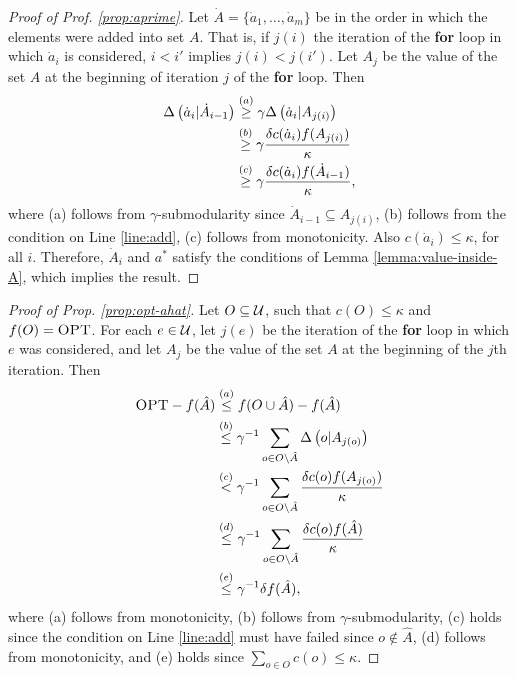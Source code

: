 \begin{proof}[Proof of Prof. \ref{prop:aprime}]
  Let $\dot A = \{\dot a_1, \ldots, \dot a_m \}$ be in the order in which the elements were added into set $A$.
  That is, if $j(i)$ the iteration of the \textbf{for} loop in which $\dot a_i$ is considered, $i < i'$ implies
  $j(i) < j(i')$. Let $A_j$ be the value of the set $A$ at the beginning of iteration $j$ of the \textbf{for}
  loop.
  Then
  \begin{align*}
    \Delta \left(  \dot a_i  |  \dot A_{i-1}  \right) &\overset{(a)}{\ge} \gamma \Delta \left(  \dot a_i  |  A_{j(i)}  \right) \\
                                       &\overset{(b)}{\ge} \gamma \frac{ \delta c( \dot a_i ) f( A_{j(i)} )}{\kappa} \\
                                       &\overset{(c)}{\ge} \gamma \frac{ \delta c( \dot a_i ) f( \dot A_{i - 1} )}{\kappa},
  \end{align*}
  where (a) follows from $\gamma$-submodularity since $\dot A_{i-1} \subseteq A_{j(i)}$,
  (b) follows from the condition on Line \ref{line:add},
  (c) follows from monotonicity. 
  Also $c(\dot a_i ) \le \kappa$, for all $i$. Therefore, $\dot A_i$ and $a^*$ satisfy the conditions of
  Lemma \ref{lemma:value-inside-A}, which implies the result. 
\end{proof}
\begin{proof}[Proof of Prop. \ref{prop:opt-ahat}]
  Let $O \subseteq \mathcal{U}$, such that $c(O) \le \kappa$ and $f(O) = \textsc{OPT}$.
  For each $e \in \mathcal{U}$, let $j(e)$ be the iteration of the \textbf{for}
  loop in which $e$ was considered, and let $A_j$ be the value of the set
  $A$ at the beginning of the $j$th iteration. 
  Then
  \begin{align*}
    \textsc{OPT} - f( \hat A ) &\overset{(a)}{\le } f( O \cup \hat A ) - f( \hat A) \\
                       &\overset{(b)}{\le } \gamma^{-1} \sum_{o \in O \setminus \hat A} \Delta \left( o |  A_{j(o)}  \right) \\
                       &\overset{(c)}{<} \gamma^{-1} \sum_{o \in O \setminus \hat A} \frac{\delta c(o) f(A_{j(o)})}{\kappa } \\
                       &\overset{(d)}{\le} \gamma^{-1} \sum_{o \in O \setminus \hat A} \frac{\delta c(o) f( \hat A )}{\kappa } \\
                       &\overset{(e)}{\le} \gamma^{-1} \delta f( \hat A ),
  \end{align*}
  where (a) follows from monotonicity,
  (b) follows from $\gamma$-submodularity,
  (c) holds since the condition on Line \ref{line:add} must have failed since $o \not \in \hat A$,
  (d) follows from monotonicity, and (e) holds since $\sum_{o \in O} c(o) \le \kappa$.
\end{proof}
